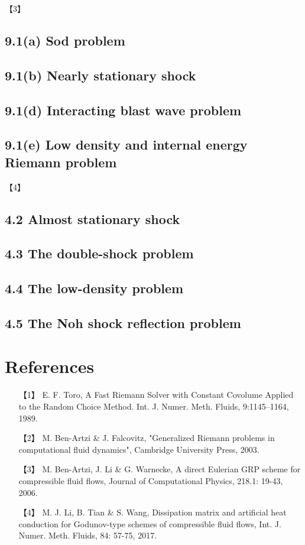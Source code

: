 \documentclass[CJK]{ctexart}
\begin{document}
【3】

\subsection*{9.1(a) Sod problem}

\subsection*{9.1(b) Nearly stationary shock}

\subsection*{9.1(d) Interacting blast wave problem}

\subsection*{9.1(e) Low density and internal energy Riemann problem}


【4】

\subsection*{4.2 Almost stationary shock}

\subsection*{4.3 The double-shock problem}

\subsection*{4.4 The low-density problem}

\subsection*{4.5 The Noh shock reflection problem}


\section*{References}

\begin{itemize}
\item[【1】] E. F. Toro, A Fast Riemann Solver with Constant Covolume Applied to the Random Choice Method. Int. J. Numer. Meth. Fluids, 9:1145–1164, 1989.

\item[【2】] M. Ben-Artzi \& J. Falcovitz, "Generalized Riemann problems in computational fluid dynamics", Cambridge University Press, 2003.

\item[【3】] M. Ben-Artzi, J. Li \& G. Warnecke, A direct Eulerian GRP scheme for compressible fluid flows, Journal of Computational Physics, 218.1: 19-43, 2006.

\item[【4】] M. J. Li, B. Tian \& S. Wang, Dissipation matrix and artificial heat conduction for Godunov-type schemes of compressible fluid flows, Int. J. Numer. Meth. Fluids, 84: 57-75, 2017.
\end{itemize}
\end{document}
